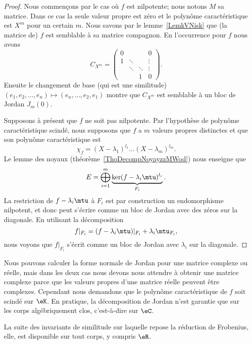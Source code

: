 \begin{proof}
	Nous commençons par le cas où \( f\) est nilpotente; nous notons \( M\) sa matrice. Dans ce cas la seule valeur propre est zéro et le polynôme caractéristique est \( X^m\) pour un certain \( m\). Nous savons par le lemme~\ref{LemkVNisk} que (la matrice de) \( f\) est semblable à sa matrice compagnon. En l'occurrence pour \( f\) nous avons
	\begin{equation}
		C_{X^m}=\begin{pmatrix}
			0 &        &        & 0      \\
			1 & \ddots &        & \vdots \\
			  & \ddots & \ddots & \vdots \\
			  &        & 1      & 0
		\end{pmatrix}.
	\end{equation}
	Ensuite le changement de base (qui est une similitude) \( (e_1, e_2,\ldots, e_n)\mapsto(e_n,\ldots, e_2, e_1)\) montre que \( C_{X^m}\) est semblable à un bloc de Jordan \( J_m(0)\).

	Supposons à présent que \( f\) ne soit pas nilpotente. Par l'hypothèse de polynôme caractéristique scindé, nous supposons que \( f\) a \( m\) valeurs propres distinctes et que son polynôme caractéristique est
	\begin{equation}
		\chi_f=(X-\lambda_1)^{l_1}\ldots (X-\lambda_m)^{l_m}.
	\end{equation}
	Le lemme des noyaux (théorème~\ref{ThoDecompNoyayzzMWod}) nous enseigne que
	\begin{equation}
		E=\bigoplus_{i=1}^m\underbrace{\ker(f-\lambda_i\mtu)^{l_i}}_{F_i}.
	\end{equation}
	La restriction de \( f-\lambda_i\mtu\) à \( F_i\) est par construction un endomorphisme nilpotent, et donc peut s'écrire comme un bloc de Jordan avec des zéros sur la diagonale. En utilisant la décomposition
	\begin{equation}
		f|_{F_i}=(f-\lambda_i\mtu)|_{F_i}+\lambda_i\mtu_{F_i},
	\end{equation}
	nous voyons que \( f|_{F_i}\) s'écrit comme un bloc de Jordan avec \( \lambda_i\) sur la diagonale.
\end{proof}

\begin{remark}
	Nous pouvons calculer la forme normale de Jordan pour une matrice complexe ou réelle, mais dans les deux cas nous devons nous attendre à obtenir une matrice complexe parce que les valeurs propres d'une matrice réelle peuvent être complexes. Cependant nous demandons que le polynôme caractéristique de \( f\) soit scindé sur \( \eK\). En pratique, la décomposition de Jordan n'est garantie que sur les corps algébriquement clos, c'est-à-dire sur \( \eC\).

	La suite des invariants de similitude sur laquelle repose la réduction de Frobenius, elle, est disponible sur tout corps, y compris \( \eR\).
\end{remark}

